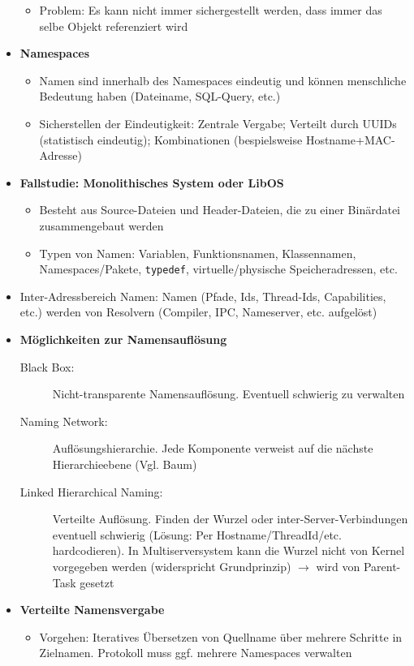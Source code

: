 \begin{itemize}
\begin{itemize}
		\item Problem: Es kann nicht immer sichergestellt werden, dass immer das selbe Objekt referenziert wird
	\end{itemize}
	\item \textbf{Namespaces}
	\begin{itemize}
		\item Namen sind innerhalb des Namespaces eindeutig und können menschliche Bedeutung haben (Dateiname, SQL-Query, etc.)
		\item Sicherstellen der Eindeutigkeit: Zentrale Vergabe; Verteilt durch UUIDs (statistisch eindeutig); Kombinationen (bespielsweise Hostname+MAC-Adresse)
	\end{itemize}
	\item \textbf{Fallstudie: Monolithisches System oder LibOS}
	\begin{itemize}
		\item Besteht aus Source-Dateien und Header-Dateien, die zu einer Binärdatei zusammengebaut werden
		\item Typen von Namen: Variablen, Funktionsnamen, Klassennamen, Namespaces/Pakete, \texttt{typedef}, virtuelle/physische Speicheradressen, etc.
	\end{itemize}
	\item Inter-Adressbereich Namen: Namen (Pfade, Ids, Thread-Ids, Capabilities, etc.) werden von Resolvern (Compiler, IPC, Nameserver, etc. aufgelöst)
	\item \textbf{Möglichkeiten zur Namensauflösung}
	\begin{description}
		\item[Black Box:] Nicht-transparente Namensauflösung. Eventuell schwierig zu verwalten
		\item[Naming Network:] Auflösungshierarchie. Jede Komponente verweist auf die nächste Hierarchieebene (Vgl. Baum)
		\item[Linked Hierarchical Naming:] Verteilte Auflösung. Finden der Wurzel oder inter-Server-Verbindungen eventuell schwierig (Lösung: Per Hostname/ThreadId/etc. hardcodieren). In Multiserversystem kann die Wurzel nicht von Kernel vorgegeben werden (widerspricht Grundprinzip) \(\rightarrow\) wird von Parent-Task gesetzt
	\end{description}
	\item \textbf{Verteilte Namensvergabe}
	\begin{itemize}
		\item Vorgehen: Iteratives Übersetzen von Quellname über mehrere Schritte in Zielnamen. Protokoll muss ggf. mehrere Namespaces verwalten

\end{itemize}
\end{itemize}

